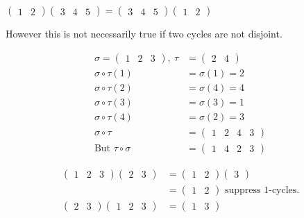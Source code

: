 \begin{example}
\(\begin{pmatrix}1 & 2\end{pmatrix} \begin{pmatrix}3 & 4 & 5\end{pmatrix} = \begin{pmatrix}3 & 4 & 5\end{pmatrix} \begin{pmatrix}1 & 2\end{pmatrix}\)
\end{example}

However this is not necessarily true if two cycles are not disjoint.

\begin{example}
\begin{align*}
    \sigma = \begin{pmatrix}1 & 2 & 3\end{pmatrix},\ \tau &= \begin{pmatrix}2 & 4\end{pmatrix} \\
    \sigma \circ \tau(1) &= \sigma(1) = 2 \\
    \sigma \circ \tau(2) &= \sigma(4) = 4 \\
    \sigma \circ \tau(3) &= \sigma(3) = 1 \\
    \sigma \circ \tau(4) &= \sigma(2) = 3 \\
    \sigma \circ \tau &= \begin{pmatrix}1 & 2 & 4 & 3\end{pmatrix} \\
    \text{But } \tau \circ \sigma &= \begin{pmatrix} 1 & 4 & 2 & 3 \end{pmatrix}
\end{align*}
\end{example}

\begin{example}
\begin{align*}
    \begin{pmatrix}1 & 2 & 3\end{pmatrix} \begin{pmatrix}2 & 3\end{pmatrix} &= \begin{pmatrix}1 & 2\end{pmatrix} \begin{pmatrix} 3 \end{pmatrix} \\
    &= \begin{pmatrix}1 & 2\end{pmatrix} \text{ suppress 1-cycles.} \\
    \begin{pmatrix}2 & 3\end{pmatrix} \begin{pmatrix}1 & 2 & 3\end{pmatrix} &= \begin{pmatrix}1 & 3\end{pmatrix} 
\end{align*}
\end{example}

